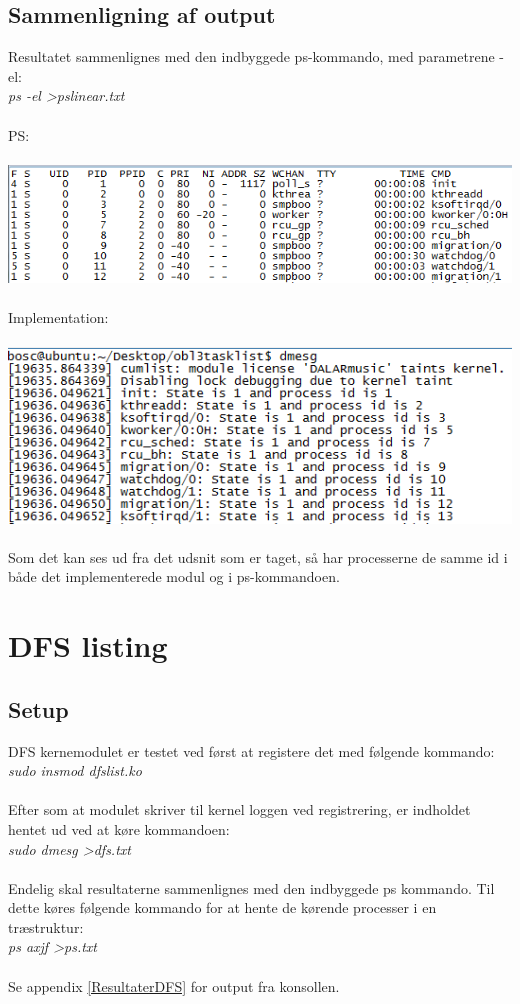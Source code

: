 \subsection{Sammenligning af output}
Resultatet sammenlignes med den indbyggede ps-kommando, med parametrene -el:\\
\textit{ps -el \textgreater pslinear.txt} \\
\\
PS:\\\\
\includegraphics[width=\textwidth]{Testing/PSLinear.png}
\\\\
Implementation:\\\\
\includegraphics[width=\textwidth]{Testing/Linear.png}
\\\\
Som det kan ses ud fra det udsnit som er taget, så har processerne de samme id i både det implementerede modul og i ps-kommandoen.

\section{DFS listing}
\subsection{Setup}
DFS kernemodulet er testet ved først at registere det med følgende kommando:\\
\textit{sudo insmod dfslist.ko}
\\
\\
Efter som at modulet skriver til kernel loggen ved registrering, er indholdet hentet ud ved at køre kommandoen:\\
\textit{sudo dmesg \textgreater dfs.txt}
\\
\\
Endelig skal resultaterne sammenlignes med den indbyggede ps kommando. Til dette køres følgende kommando for at hente de kørende processer i en træstruktur:\\
\textit{ps axjf \textgreater ps.txt}
\\
\\
Se appendix \ref{ResultaterDFS} for output fra konsollen.


